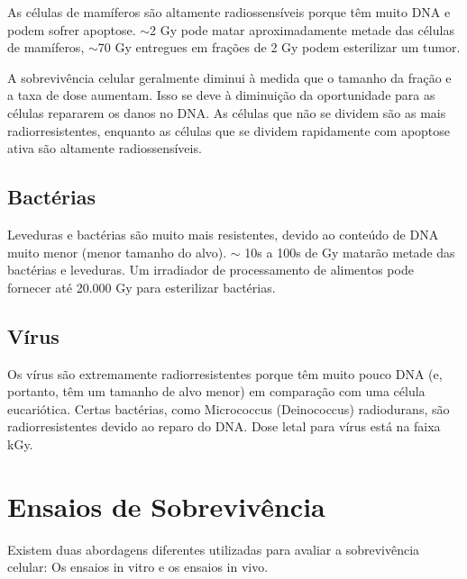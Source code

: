 \documentclass[11pt,a4paper]{article}
\begin{document}
	As células de mamíferos são altamente radiossensíveis porque têm muito DNA e podem sofrer apoptose. $\sim$2 Gy pode matar aproximadamente metade das células de mamíferos, $\sim$70 Gy entregues em frações de 2 Gy podem esterilizar um tumor.

	A sobrevivência celular geralmente diminui à medida que o tamanho da fração e a taxa de dose aumentam. Isso se deve à diminuição da oportunidade para as células repararem os danos no DNA. As células que não se dividem são as mais radiorresistentes, enquanto as células que se dividem rapidamente com apoptose ativa são altamente radiossensíveis.

\subsection*{Bactérias}

	Leveduras e bactérias são muito mais resistentes, devido ao conteúdo de DNA muito menor (menor tamanho do alvo). $\sim$ 10s a 100s de Gy matarão metade das bactérias e leveduras. Um irradiador de processamento de alimentos pode fornecer até 20.000 Gy para esterilizar bactérias. 

\subsection*{Vírus}

	Os vírus são extremamente radiorresistentes porque têm muito pouco DNA (e, portanto, têm um tamanho de alvo menor) em comparação com uma célula eucariótica. Certas bactérias, como Micrococcus (Deinococcus) radiodurans, são radiorresistentes devido ao reparo do DNA. Dose letal para vírus está na faixa kGy.

\section{Ensaios de Sobrevivência}

	Existem duas abordagens diferentes utilizadas para avaliar a sobrevivência celular: Os ensaios in vitro e os ensaios in vivo.
\end{document}
